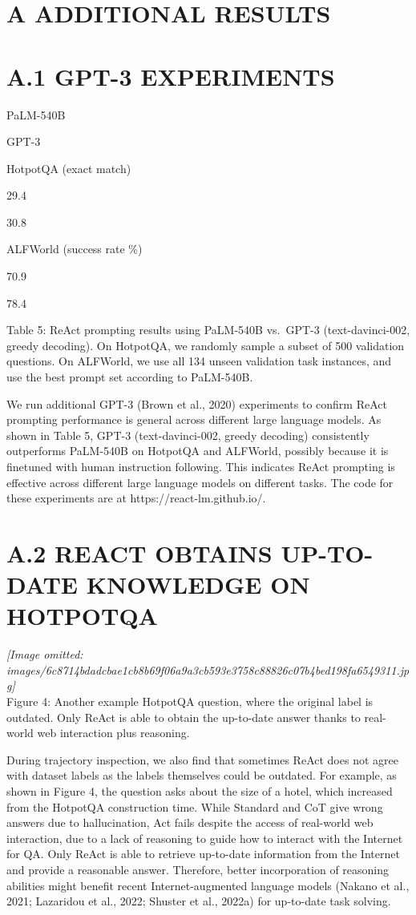\documentclass[
]{article}
\begin{document}
\section{A ADDITIONAL RESULTS}\label{a-additional-results}

\section{A.1 GPT-3 EXPERIMENTS}\label{a.1-gpt-3-experiments}

PaLM-540B

GPT-3

HotpotQA (exact match)

29.4

30.8

ALFWorld (success rate \%)

70.9

78.4

Table 5: ReAct prompting results using PaLM-540B vs.~GPT-3
(text-davinci-002, greedy decoding). On HotpotQA, we randomly sample a
subset of 500 validation questions. On ALFWorld, we use all 134 unseen
validation task instances, and use the best prompt set according to
PaLM-540B.

We run additional GPT-3 (Brown et al., 2020) experiments to confirm
ReAct prompting performance is general across different large language
models. As shown in Table 5, GPT-3 (text-davinci-002, greedy decoding)
consistently outperforms PaLM-540B on HotpotQA and ALFWorld, possibly
because it is finetuned with human instruction following. This indicates
ReAct prompting is effective across different large language models on
different tasks. The code for these experiments are at
https://react-lm.github.io/.

\section{A.2 REACT OBTAINS UP-TO-DATE KNOWLEDGE ON
HOTPOTQA}\label{a.2-react-obtains-up-to-date-knowledge-on-hotpotqa}

\textit{[Image omitted: images/6c8714bdadcbae1cb8b69f06a9a3cb593e3758c88826c07b4bed198fa6549311.jpg]}\\
Figure 4: Another example HotpotQA question, where the original label is
outdated. Only ReAct is able to obtain the up-to-date answer thanks to
real-world web interaction plus reasoning.

During trajectory inspection, we also find that sometimes ReAct does not
agree with dataset labels as the labels themselves could be outdated.
For example, as shown in Figure 4, the question asks about the size of a
hotel, which increased from the HotpotQA construction time. While
Standard and CoT give wrong answers due to hallucination, Act fails
despite the access of real-world web interaction, due to a lack of
reasoning to guide how to interact with the Internet for QA. Only ReAct
is able to retrieve up-to-date information from the Internet and provide
a reasonable answer. Therefore, better incorporation of reasoning
abilities might benefit recent Internet-augmented language models
(Nakano et al., 2021; Lazaridou et al., 2022; Shuster et al., 2022a) for
up-to-date task solving.
\end{document}
